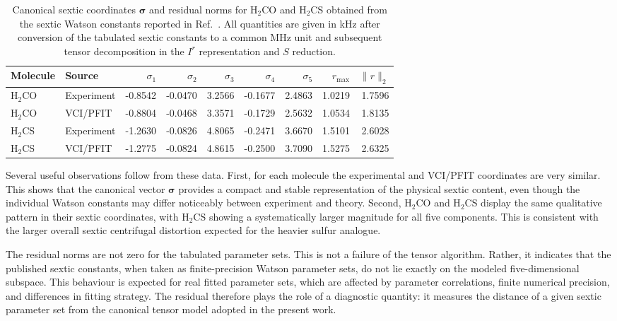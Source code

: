 \begin{table}[ht]
\centering
\caption{Canonical sextic coordinates $\boldsymbol\sigma$ and residual norms
for H$_2$CO and H$_2$CS obtained from the sextic Watson constants reported in
Ref.~.  All quantities are given in kHz after conversion of
the tabulated sextic constants to a common MHz unit and subsequent tensor
decomposition in the $I^r$ representation and $S$ reduction.}

\begin{tabular}{llrrrrrrr}
\hline
Molecule & Source & $\sigma_1$ & $\sigma_2$ & $\sigma_3$ & $\sigma_4$ & $\sigma_5$ & $r_{\max}$ & $\|r\|_2$ \\
\hline
H$_2$CO & Experiment & -0.8542 & -0.0470 & 3.2566 & -0.1677 & 2.4863 & 1.0219 & 1.7596 \\
H$_2$CO & VCI/PFIT   & -0.8804 & -0.0468 & 3.3571 & -0.1729 & 2.5632 & 1.0534 & 1.8135 \\
H$_2$CS & Experiment & -1.2630 & -0.0826 & 4.8065 & -0.2471 & 3.6670 & 1.5101 & 2.6028 \\
H$_2$CS & VCI/PFIT   & -1.2775 & -0.0824 & 4.8615 & -0.2500 & 3.7090 & 1.5275 & 2.6325 \\
\hline
\end{tabular}

\label{tab:sextic_sigma_h2co_h2cs}
\end{table}

Several useful observations follow from these data.  First, for each
molecule the experimental and VCI/PFIT coordinates are very similar.  This
shows that the canonical vector $\boldsymbol\sigma$ provides a compact and
stable representation of the physical sextic content, even though the
individual Watson constants may differ noticeably between experiment and
theory.  Second, H$_2$CO and H$_2$CS display the same qualitative pattern in
their sextic coordinates, with H$_2$CS showing a systematically larger
magnitude for all five components.  This is consistent with the larger
overall sextic centrifugal distortion expected for the heavier sulfur
analogue.

The residual norms are not zero for the tabulated parameter sets.
This is not a failure of the tensor algorithm.  Rather, it indicates that
the published sextic constants, when taken as finite-precision Watson
parameter sets, do not lie exactly on the modeled five-dimensional subspace.
This behaviour is expected for real fitted parameter sets, which are affected
by parameter correlations, finite numerical precision, and differences in
fitting strategy.  The residual therefore plays the role of a diagnostic
quantity: it measures the distance of a given sextic parameter set from the
canonical tensor model adopted in the present work.

